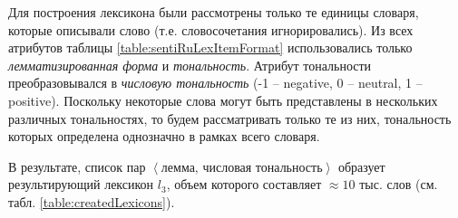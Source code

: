 Для построения лексикона были рассмотрены только те единицы словаря,
которые описывали слово (т.е. словосочетания игнорировались).
Из всех атрибутов таблицы \ref{table:sentiRuLexItemFormat} использовались
только {\it лемматизированная форма} и {\it тональность}.
Атрибут тональности преобразовывался в {\it числовую тональность}
(-1 -- negative,
0 -- neutral,
1 -- positive).
Поскольку некоторые слова могут быть представлены
в нескольких различных тональностях, то будем рассматривать только те из них,
тональность которых определена однозначно в рамках всего словаря.

В результате, список пар $\left< \text{лемма, числовая тональность} \right>$
образует результирующий лексикон $l_3$, объем которого составляет $\approx10$ тыс. слов
(см. табл. \ref{table:createdLexicons}).

